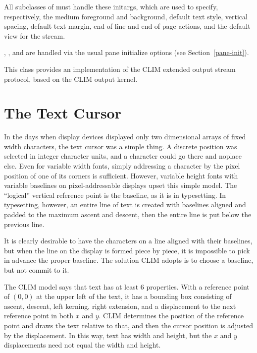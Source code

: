 All subclasses of  must handle these initargs, which
are used to specify, respectively, the medium foreground and background, default
text style, vertical spacing, default text margin, end of line and end of page
actions, and the default view for the stream.

, , and  are handled via the
usual pane initialize options (see Section~\ref{pane-init}).


This class provides an implementation of the CLIM extended output stream
protocol, based on the CLIM output kernel.

\Mutable


\section {The Text Cursor}

In the days when display devices displayed only two dimensional arrays of fixed
width characters, the text cursor was a simple thing.  A discrete position was
selected in integer character units, and a character could go there and noplace
else.  Even for variable width fonts, simply addressing a character by the pixel
position of one of its corners is sufficient.  However, variable height fonts
with variable baselines on pixel-addressable displays upset this simple model.
The ``logical'' vertical reference point is the baseline, as it is in
typesetting.  In typesetting, however, an entire line of text is created with
baselines aligned and padded to the maximum ascent and descent, then the entire
line is put below the previous line.  

It is clearly desirable to have the characters on a line aligned with their
baselines, but when the line on the display is formed piece by piece, it is
impossible to pick in advance the proper baseline.  The solution CLIM adopts is
to choose a baseline, but not commit to it.

The CLIM model says that text has at least 6 properties.  With a reference point
of $(0,0)$ at the upper left of the text, it has a bounding box consisting of
ascent, descent, left kerning, right extension, and a displacement to the next
reference point in both $x$ and $y$.  CLIM determines the position of the
reference point and draws the text relative to that, and then the cursor
position is adjusted by the displacement.  In this way, text has width and
height, but the $x$ and $y$ displacements need not equal the width and height.

